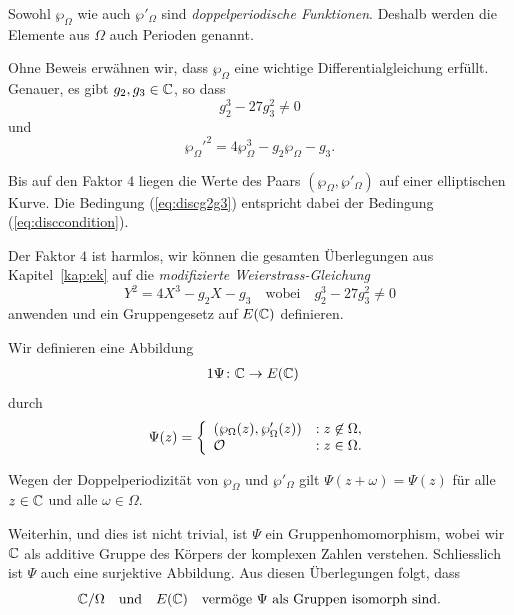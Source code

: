 \begin{bemerkung}
  Sowohl $\wp_\Omega$ wie auch $\wp'_\Omega$ sind \emph{doppelperiodische
    Funktionen}. Deshalb werden die Elemente aus $\Omega$ auch
  Perioden genannt. 
\end{bemerkung}

Ohne Beweis erwähnen wir, dass $\wp_\Omega$ eine wichtige
Differentialgleichung erfüllt. Genauer, es gibt $g_2,g_3\in{\mathbb{C}}$, so
dass
\begin{equation}
  \label{eq:discg2g3}
  g_2^3-27g_3^2 \not=0
\end{equation}
und 
\begin{equation}
  \label{eq:weierstrassdgl}
  {\wp_\Omega'}^2  = 4 \wp_\Omega^3 - g_2\wp_\Omega - g_3.  
\end{equation}


Bis auf den Faktor $4$ liegen die Werte des Paars
$(\wp_\Omega,\wp'_\Omega)$ auf einer elliptischen Kurve. 
Die Bedingung (\ref{eq:discg2g3}) entspricht dabei der Bedingung
(\ref{eq:disccondition}).

Der Faktor $4$ ist harmlos, wir können die gesamten Überlegungen aus
Kapitel~\ref{kap:ek} auf die \emph{modifizierte Weierstrass-Gleichung}
\begin{equation}
  \label{eq:modweierstrass}
  Y^2 = 4X^3-g_2X-g_3 \quad\text{wobei}\quad   g_2^3-27g_3^2 \not=0
\end{equation}
anwenden und ein Gruppengesetz auf $E({\mathbb{C}})$ definieren.

Wir definieren eine Abbildung
\begin{alignat*}1
  \Psi \colon &\IC\rightarrow E(\IC)
\end{alignat*}
durch
\begin{equation*}
  \Psi(z) = \left\{
    \begin{array}{ll}
      (\wp_\Omega(z),\wp'_\Omega(z)) &: z\not\in\Omega, \\
      {\mathcal O} &:z\in \Omega.
    \end{array}\right.
\end{equation*}

Wegen der Doppelperiodizität von $\wp_\Omega$ und $\wp'_\Omega$
gilt $\Psi(z+\omega) = \Psi(z)$ für alle $z\in{\mathbb{C}}$ und alle
$\omega\in\Omega$.

Weiterhin, und dies ist nicht trivial, ist $\Psi$ ein
Gruppenhomomorphism, wobei wir ${\mathbb{C}}$ als additive Gruppe des Körpers
der komplexen Zahlen verstehen. Schliesslich ist $\Psi$ auch eine
surjektive Abbildung. Aus diesen Überlegungen folgt, dass
\begin{equation*}
  {\mathbb{C}}/\Omega \quad\text{und}\quad E({\mathbb{C}})\quad\text{vermöge $\Psi$ als Gruppen isomorph sind.}
\end{equation*}

